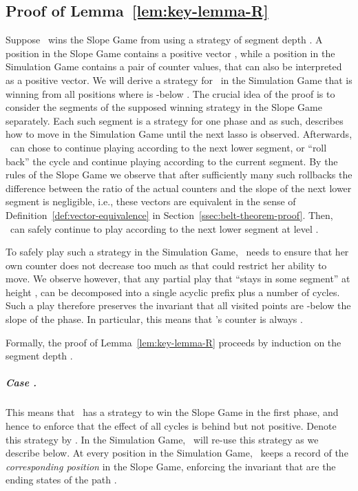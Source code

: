 

\subsection{Proof of Lemma~\ref{lem:key-lemma-R}}  \label{sec:proof-R}

Suppose \R\ wins the Slope Game from  using a strategy of segment depth .
A position in the Slope Game contains a positive vector ,
while a position in the Simulation Game contains a pair  
of counter values, that can also be interpreted as a positive vector.
We will derive a strategy for \R\ in the Simulation Game that is winning from all positions
 where  is -below .
The crucial idea of the proof is to consider the segments of the supposed winning strategy in the
Slope Game separately.
Each such segment is a strategy for one phase and as such, describes how to move in
the Simulation Game until the next lasso is observed. Afterwards, \R\ can
chose to continue playing according to the next lower segment, or ``roll back'' the
cycle and continue playing according to the current segment.
By the rules of the Slope Game we observe that after sufficiently many such rollbacks
the difference between the ratio  of the actual counters and the slope of the next
lower segment is negligible, i.e., these vectors are equivalent in the sense
of Definition~\ref{def:vector-equivalence} in Section~\ref{ssec:belt-theorem-proof}.
Then, \R\ can safely continue to play according to the next lower segment at level
.


To safely play such a strategy in the Simulation Game, \R\ needs to ensure that her own
counter does not decrease too much as that could restrict her ability to move.
We observe however, that any partial play that ``stays in some segment'' at height ,
can be decomposed into a single acyclic prefix plus a number of cycles.
Such a play therefore preserves the invariant that all visited points are
-below the slope of the phase. In particular, this means that \R's
counter is always .

Formally, the proof of Lemma~\ref{lem:key-lemma-R} proceeds by induction on the segment depth .

\subparagraph*{Case .} 
This means that \R\ has a strategy to win the Slope Game in the first phase,
and hence to enforce that the effect of all cycles is behind  but not
positive. Denote this strategy by .
In the Simulation Game, \R\ will re-use this strategy as we describe below.
At every position  in the Simulation Game, 
\R\ keeps a record of the \emph{corresponding position}  in the Slope Game, enforcing the
invariant that  are the ending states of the path .

